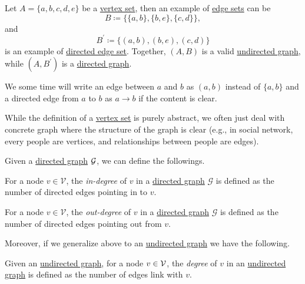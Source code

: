 \begin{eg}
	Let \(A = \{a, b, c, d, e\}\) be a \hyperref[def:vertex-set]{vertex set}, then an example of \hyperref[def:edge-set]{edge sets} can be
	\[
		B \coloneqq \{\{a, b\}, \{b, e\}, \{c, d\}\},
	\]
	and
	\[
		B^\prime \coloneqq \{(a, b), (b, e), (c, d)\}
	\]
	is an example of \hyperref[def:directed-edge-set]{directed edge set}. Together, \((A, B)\) is a valid \hyperref[def:undirected-graph]{undirected graph}, while
	\((A, B^\prime )\) is a \hyperref[def:directed-graph]{directed graph}.
\end{eg}

\begin{notation}
	We some time will write an edge between \(a\) and \(b\) as \((a, b)\) instead of \(\{a, b\}\) and a directed edge from \(a\) to \(b\) as \(a\to b\) if the content is clear.
\end{notation}

\begin{note}
	While the definition of a \hyperref[def:vertex-set]{vertex set} is purely abstract, we often just deal with concrete graph where the structure of the graph is
	clear (e.g., in social network, every people are vertices, and relationships between people are edges).
\end{note}

\begin{definition*}
	Given a \hyperref[def:directed-graph]{directed graph} \(\mathcal{\MakeUppercase{g}} \), we can define the followings.
	\begin{definition}[In-degree]\label{def:in-degree}
		For a node \(v\in\mathcal{V}\), the \emph{in-degree} of \(v\) in a \hyperref[def:directed-graph]{directed graph} \(\mathcal{G}\) is defined as the number of
		directed edges pointing in to \(v\).
	\end{definition}

	\begin{definition}\label{def:out-degree}
		For a node \(v\in\mathcal{V}\), the \emph{out-degree} of \(v\) in a \hyperref[def:directed-graph]{directed graph} \(\mathcal{G}\) is defined as the number of
		directed edges pointing out from \(v\).
	\end{definition}
\end{definition*}

Moreover, if we generalize above to an \hyperref[def:undirected-graph]{undirected graph} we have the following.
\begin{definition}[Degree]\label{def:degree}
	Given an \hyperref[def:undirected-graph]{undirected graph}, for a node \(v\in \mathcal{\MakeUppercase{v}} \), the \emph{degree} of \(v\) in an
	\hyperref[def:undirected-graph]{undirected graph} is defined as the number of edges link with \(v\).
\end{definition}

